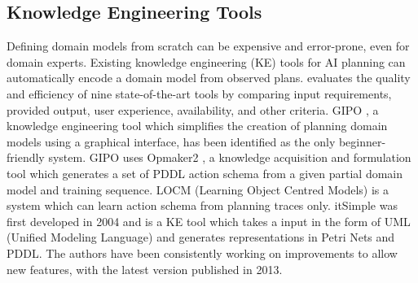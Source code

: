 \subsection{Knowledge Engineering Tools}\label{subsec:Knowledge Engineering}
Defining domain models from scratch can be expensive and error-prone, even for domain experts.
Existing knowledge engineering (KE) tools for AI planning can automatically encode a domain model from observed plans.
\cite{jilani2014automated} evaluates the quality and efficiency of nine state-of-the-art tools by comparing input requirements, provided output, user experience, availability, and other criteria.
GIPO \cite{simpson2007planning}, a knowledge engineering tool which simplifies the creation of planning domain models using a graphical interface, has been identified as the only beginner-friendly system.
GIPO uses Opmaker2 \cite{mccluskey2009automated}, a knowledge acquisition and formulation tool which generates a set of PDDL action schema from a given partial domain model and training sequence.
LOCM (Learning Object Centred Models) \cite{cresswell2013acquiring} is a system which can learn action schema from planning traces only.
itSimple \cite{vaquero2013itsimple} was first developed in 2004 and is a KE tool which takes a input in the form of UML (Unified Modeling Language)\cite{omg2005unified} and generates representations in Petri Nets \cite{murata1989petri} and PDDL. The authors have been consistently working on improvements to allow new features, with the latest version published in 2013.